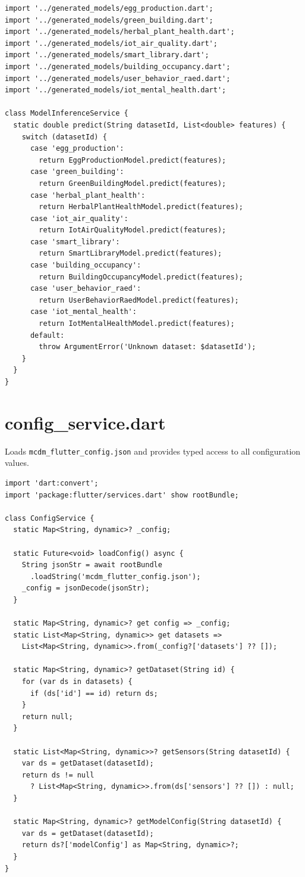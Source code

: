 \documentclass[12pt,a4paper,oneside]{report}
\begin{document}
\begin{lstlisting}[style=dartstyle]
import '../generated_models/egg_production.dart';
import '../generated_models/green_building.dart';
import '../generated_models/herbal_plant_health.dart';
import '../generated_models/iot_air_quality.dart';
import '../generated_models/smart_library.dart';
import '../generated_models/building_occupancy.dart';
import '../generated_models/user_behavior_raed.dart';
import '../generated_models/iot_mental_health.dart';

class ModelInferenceService {
  static double predict(String datasetId, List<double> features) {
    switch (datasetId) {
      case 'egg_production':
        return EggProductionModel.predict(features);
      case 'green_building':
        return GreenBuildingModel.predict(features);
      case 'herbal_plant_health':
        return HerbalPlantHealthModel.predict(features);
      case 'iot_air_quality':
        return IotAirQualityModel.predict(features);
      case 'smart_library':
        return SmartLibraryModel.predict(features);
      case 'building_occupancy':
        return BuildingOccupancyModel.predict(features);
      case 'user_behavior_raed':
        return UserBehaviorRaedModel.predict(features);
      case 'iot_mental_health':
        return IotMentalHealthModel.predict(features);
      default:
        throw ArgumentError('Unknown dataset: $datasetId');
    }
  }
}
\end{lstlisting}

\section{config\_service.dart}

Loads \texttt{mcdm\_flutter\_config.json} and provides typed access to all configuration values.

\begin{lstlisting}[style=dartstyle]
import 'dart:convert';
import 'package:flutter/services.dart' show rootBundle;

class ConfigService {
  static Map<String, dynamic>? _config;

  static Future<void> loadConfig() async {
    String jsonStr = await rootBundle
      .loadString('mcdm_flutter_config.json');
    _config = jsonDecode(jsonStr);
  }

  static Map<String, dynamic>? get config => _config;
  static List<Map<String, dynamic>> get datasets =>
    List<Map<String, dynamic>>.from(_config?['datasets'] ?? []);

  static Map<String, dynamic>? getDataset(String id) {
    for (var ds in datasets) {
      if (ds['id'] == id) return ds;
    }
    return null;
  }

  static List<Map<String, dynamic>>? getSensors(String datasetId) {
    var ds = getDataset(datasetId);
    return ds != null
      ? List<Map<String, dynamic>>.from(ds['sensors'] ?? []) : null;
  }

  static Map<String, dynamic>? getModelConfig(String datasetId) {
    var ds = getDataset(datasetId);
    return ds?['modelConfig'] as Map<String, dynamic>?;
  }
}
\end{lstlisting}
\end{document}
